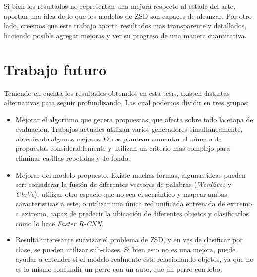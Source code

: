 Si bien los resultados no representan una mejora respecto al estado del arte, aportan una idea de lo que los modelos de ZSD son capaces de alcanzar. Por otro lado, creemos que este trabajo aporta resultados mas transparente y detallados, haciendo posible agregar mejoras y ver su progreso de una manera cuantitativa.


\section{Trabajo futuro} \label{sec:trabajo futuro}

Teniendo en cuenta los resultados obtenidos en esta tesis, existen distintas alternativas para seguir profundizando. Las cual podemos dividir en tres grupos:

\begin{itemize}
	\item Mejorar el algoritmo que genera propuestas, que afecta sobre todo la etapa de evaluacion. Trabajos actuales utilizan varios generadores simultáneamente, obteniendo algunas mejoras. Otros plantean aumentar el número de propuestas considerablemente y utilizan un criterio mas complejo para eliminar casillas repetidas y de fondo.
	\item Mejorar del modelo propuesto. Existe muchas formas, algunas ideas pueden ser: considerar la fusión de diferentes vectores de palabras (\textit{Word2vec} y \textit{GloVe}); utilizar otro espacio que no sea el semántico y mapear ambas caracteristicas a este; o utilizar una única red unificada entrenada de extremo a extremo, capaz de predecir la ubicación de diferentes objetos y clasificarlos como lo hace \textit{Faster R-CNN}.
	\item Resulta interesante suavizar el problema de ZSD, y en ves de clasificar por clase, se pueden utilizar sub-clases. Si bien esto no es una mejora, puede ayudar a entender si el modelo realmente esta relacionando objetos, ya que no es lo mismo confundir un perro con un auto, que un perro con lobo.
\end{itemize}
